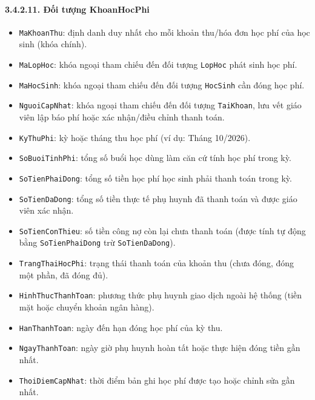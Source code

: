 \paragraph{3.4.2.11. Đối tượng KhoanHocPhi}\mbox{}
\begin{itemize}\setlength{\itemsep}{2pt}\setlength{\parskip}{0pt}
    \item \texttt{MaKhoanThu}: định danh duy nhất cho mỗi khoản thu/hóa đơn học phí của học sinh (khóa chính).
    \item \texttt{MaLopHoc}: khóa ngoại tham chiếu đến đối tượng \texttt{LopHoc} phát sinh học phí.
    \item \texttt{MaHocSinh}: khóa ngoại tham chiếu đến đối tượng \texttt{HocSinh} cần đóng học phí.
    \item \texttt{NguoiCapNhat}: khóa ngoại tham chiếu đến đối tượng \texttt{TaiKhoan}, lưu vết giáo viên lập báo phí hoặc xác nhận/điều chỉnh thanh toán.
    \item \texttt{KyThuPhi}: kỳ hoặc tháng thu học phí (ví dụ: Tháng 10/2026).
    \item \texttt{SoBuoiTinhPhi}: tổng số buổi học dùng làm căn cứ tính học phí trong kỳ.
    \item \texttt{SoTienPhaiDong}: tổng số tiền học phí học sinh phải thanh toán trong kỳ.
    \item \texttt{SoTienDaDong}: tổng số tiền thực tế phụ huynh đã thanh toán và được giáo viên xác nhận.
    \item \texttt{SoTienConThieu}: số tiền công nợ còn lại chưa thanh toán (được tính tự động bằng \texttt{SoTienPhaiDong} trừ \texttt{SoTienDaDong}).
    \item \texttt{TrangThaiHocPhi}: trạng thái thanh toán của khoản thu (chưa đóng, đóng một phần, đã đóng đủ).
    \item \texttt{HinhThucThanhToan}: phương thức phụ huynh giao dịch ngoài hệ thống (tiền mặt hoặc chuyển khoản ngân hàng).
    \item \texttt{HanThanhToan}: ngày đến hạn đóng học phí của kỳ thu.
    \item \texttt{NgayThanhToan}: ngày giờ phụ huynh hoàn tất hoặc thực hiện đóng tiền gần nhất.
    \item \texttt{ThoiDiemCapNhat}: thời điểm bản ghi học phí được tạo hoặc chỉnh sửa gần nhất.
\end{itemize}

